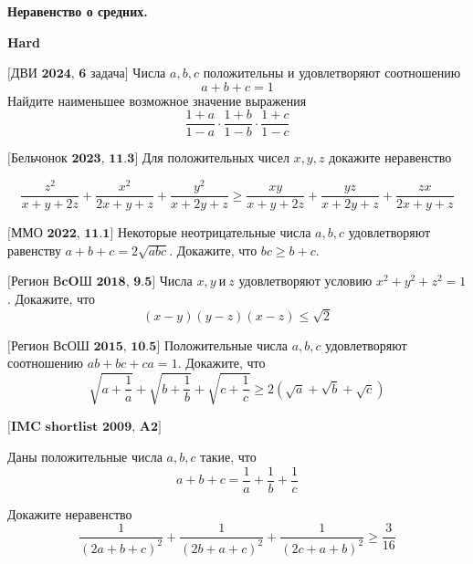 \centerline{\bf \Huge Неравенство о средних.}
\centerline{\bf \Huge Hard}

\begin{flushright}
        \scriptsize{}
\end{flushright}

$\bigl[\textbf{ДВИ 2024, 6 задача}\bigr]$
Числа $a,b,c$   положительны и удовлетворяют соотношению
\[a+b+c = 1\]
Найдите наименьшее возможное значение выражения
\[\dfrac{1+a}{1-a}\cdot\dfrac{1+b}{1-b}\cdot\dfrac{1+c}{1-c}\]

$\bigl[\textbf{Бельчонок 2023, 11.3}\bigr]$
Для положительных чисел \( x, y, z \) докажите неравенство

\[
\dfrac{z^2}{x + y + 2z} + \dfrac{x^2}{2x + y + z} + \dfrac{y^2}{x + 2y + z} \geq \dfrac{xy}{x + y + 2z} + \dfrac{yz}{x + 2y + z} + \dfrac{zx}{2x + y + z}
\]


$\bigl[\textbf{ММО 2022, 11.1}\bigr]$
Некоторые неотрицательные числа $a,b,c$   удовлетворяют равенству $a+ b+c =2\sqrt{abc}.$   Докажите, что $bc \geq b+c$.  


$\bigl[\textbf{Регион ВcOШ 2018, 9.5}\bigr]$
Числа $x, y \ \text{и} \ z$  удовлетворяют условию $x^2+ y^2+ z^2 = 1$. Докажите, что
\[(x - y)(y - z)(x - z) \leq \sqrt{2}\]

$\bigl[\textbf{Регион ВсОШ 2015, 10.5}\bigr]$
Положительные числа $a,b,c$ удовлетворяют соотношению $ab + bc + ca= 1$. Докажите, что
\[\sqrt{a + \dfrac{1}{a}}+\sqrt{b + \dfrac{1}{b}}+\sqrt{c + \dfrac{1}{c}} \geq 2(\sqrt{a} + \sqrt{b} + \sqrt{c})\]

$\bigl[\textbf{IMC shortlist 2009, A2}\bigr]$

Даны положительные числа $a,b,c$ такие, что
\[a + b + c= \dfrac{1}{a} + \dfrac{1}{b} + \dfrac{1}{c}\]

Докажите неравенство
\[\dfrac{1}{(2a+b+c)^2} + \dfrac{1}{(2b+a+c)^2}+\dfrac{1}{(2c+a+b)^2} \geq \dfrac{3}{16}\]
